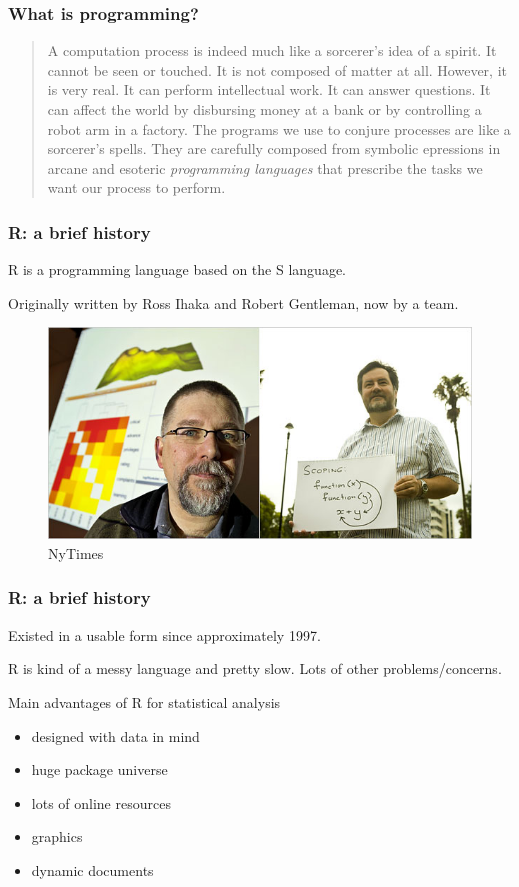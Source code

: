 \documentclass{beamer}\usepackage{graphicx, color}
\begin{document}
\begin{frame}
  \frametitle{What is programming?}
  \begin{quotation}
    A computation process is indeed much like a sorcerer's idea of a spirit. It cannot be seen or touched. It is not composed of matter at all. However, it is very real. It can perform intellectual work. It can answer questions. It can affect the world by disbursing money at a bank or by controlling a robot arm in a factory. The programs we use to conjure processes are like a sorcerer's spells. They are carefully composed from symbolic epressions in arcane and esoteric \textit{programming languages} that prescribe the tasks we want our process to perform.
  \end{quotation}
\end{frame}

\begin{frame}
  \frametitle{R: a brief history}
  R is a programming language based on the S language.

  Originally written by Ross Ihaka and Robert Gentleman, now by a team.

  \begin{figure}[h]
    \captionsetup{justification = raggedleft, slc = off}
    \includegraphics[width = \textwidth, keepaspectratio = true]{figure/ihaka_gentleman}
    \caption*{NyTimes}
    \label{fig:creators}
  \end{figure}

\end{frame}

\begin{frame}
  \frametitle{R: a brief history}
  Existed in a usable form since approximately 1997.

  R is kind of a messy language and pretty slow. Lots of other problems/concerns.

  Main advantages of R for statistical analysis
  \begin{itemize}
    \item designed with data in mind
    \item huge package universe
    \item lots of online resources
    \item graphics
    \item dynamic documents
  \end{itemize}

\end{frame}
\end{document}
